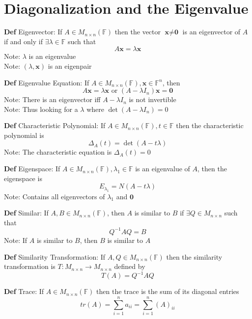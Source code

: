 \documentclass[11pt,notitlepage]{report}
\newcommand{\bb}[1]{\ensuremath{\mathbb{#1}}}
\newcommand{\tbf}[1]{\textbf{#1}}
\begin{document}
\newpage


\section{Diagonalization and the Eigenvalue}

\textbf{Def} Eigenvector: If $A \in M_{n \times n}(\bb F)$ then the vector $\tbf x \ne \tbf 0$ is an eigenvector of $A$ if and only if $\exists \lambda \in \bb F$ such that
$$A\tbf x = \lambda \tbf x$$
\hspace*{5mm} Note: $\lambda$ is an eigenvalue\\
\hspace*{5mm} Note: $(\lambda, \tbf x)$ is an eigenpair

\textbf{Def} Eigenvalue Equation: If $A \in M_{n \times n}(\bb F), \tbf x \in \bb F^n$, then
$$A\tbf x = \lambda \tbf x \text{ or } (A-\lambda I_n)\tbf x = \tbf 0$$
\hspace*{5mm} Note: There is an eigenvector iff $A - \lambda I_n$ is not invertible\\
\hspace*{5mm} Note: Thus looking for a $\lambda$ where $\det(A - \lambda I_n) = 0$

\textbf{Def} Characteristic Polynomial: If $A \in M_{n \times n}(\bb F), t \in \bb F$ then the characteristic polynomial is
$$\Delta_A (t) = \det(A - t \lambda)$$
\hspace*{5mm} Note: The characteristic equation is $\Delta_A (t) = 0$

\textbf{Def} Eigenspace: If $A \in M_{n \times n}(\bb F), \lambda_1 \in \bb F$ is an eigenvalue of $A$, then the eigenspace is
$$E_{\lambda_1} = N(A - t \lambda)$$
\hspace*{5mm} Note: Contains all eigenvectors of $\lambda_1$ and $\tbf 0$

\textbf{Def} Similar: If $A, B \in M_{n \times n}(\bb F)$, then $A$ is similar to $B$ if $\exists Q \in M_{n \times n}$ such that
$$Q^{-1}AQ = B$$
\hspace*{5mm} Note: If $A$ is similar to $B$, then $B$ is similar to $A$

\textbf{Def} Similarity Transformation: If $A, Q \in M_{n \times n}(\bb F)$ then the similarity transformation is $T: M_{n \times n} \to M_{n \times n}$ defined by
$$T(A) = Q^{-1}AQ$$

\textbf{Def} Trace: If $A \in M_{n \times n}(\bb F)$ then the trace is the sum of its diagonal entries
$$tr(A) = \sum_{i=1}^n a_{ii} = \sum_{i=1}^n (A)_{ii}$$
\end{document}
